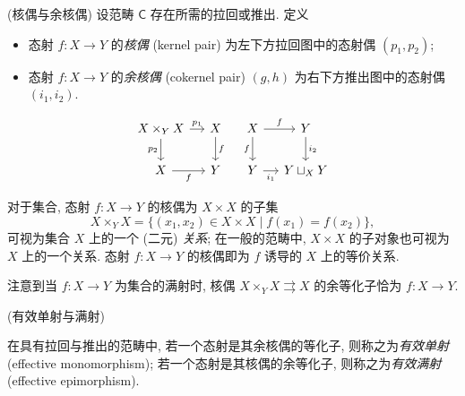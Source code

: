 \begin{definition}
	{(核偶与余核偶)}
	设范畴 $\mathsf C$ 存在所需的拉回或推出. 定义
	\begin{itemize}
		\item 态射 $f\colon X\to Y$ 的\emph{核偶} (kernel pair) 为左下方拉回图中的态射偶 $(p_1,p_2)$;
		\item 态射 $f\colon X\to Y$ 的\emph{余核偶} (cokernel pair) $(g,h)$ 为右下方推出图中的态射偶 $(i_1,i_2)$.
	\end{itemize}
	\[\begin{tikzcd}[ampersand replacement=\&,column sep=small]
		{X\times_Y X} \& X \& X \& Y \\
		X \& Y \& Y \& {Y\sqcup_X Y}
		\arrow["f"', from=2-1, to=2-2]
		\arrow["f", from=1-2, to=2-2]
		\arrow["p_1", from=1-1, to=1-2]
		\arrow["p_2"', from=1-1, to=2-1]
		\arrow["f", from=1-3, to=1-4]
		\arrow["f"', from=1-3, to=2-3]
		\arrow["i_1"', from=2-3, to=2-4]
		\arrow["i_2", from=1-4, to=2-4]
	\end{tikzcd}\]
\end{definition}


对于集合, 态射 $f\colon X\to Y$ 的核偶为 $X\times X$ 的子集
$$
	X\times_Y X = \{(x_1,x_2)\in X\times X \mid f(x_1)=f(x_2)\},
$$
可视为集合 $X$ 上的一个 (二元) \emph{关系}; 在一般的范畴中, $X\times X$ 的子对象也可视为 $X$ 上的一个关系.
态射 $f\colon X\to Y$ 的核偶即为 $f$ 诱导的 $X$ 上的等价关系.

注意到当 $f\colon X\to Y$ 为集合的满射时, 核偶 $X\times_Y X \rightrightarrows X$ 的余等化子恰为 $f\colon X\to Y$.

\begin{definition}
	{(有效单射与满射)}
	
	在具有拉回与推出的范畴中, 若一个态射是其余核偶的等化子, 则称之为\emph{有效单射} (effective monomorphism);
	若一个态射是其核偶的余等化子, 则称之为\emph{有效满射} (effective epimorphism).
\end{definition}

